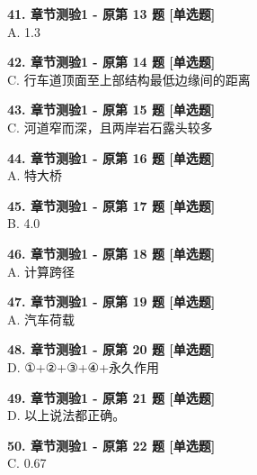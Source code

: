 \documentclass[UTF8,zihao=-4,openany]{ctexbook}
\begin{document}
\begin{answerline}
\textbf{41. 章节测验1 - 原第 13 题 [单选题]}\\
A. 1.3
\end{answerline}

\begin{answerline}
\textbf{42. 章节测验1 - 原第 14 题 [单选题]}\\
C. 行车道顶面至上部结构最低边缘间的距离
\end{answerline}

\begin{answerline}
\textbf{43. 章节测验1 - 原第 15 题 [单选题]}\\
C. 河道窄而深，且两岸岩石露头较多
\end{answerline}

\begin{answerline}
\textbf{44. 章节测验1 - 原第 16 题 [单选题]}\\
A. 特大桥
\end{answerline}

\begin{answerline}
\textbf{45. 章节测验1 - 原第 17 题 [单选题]}\\
B. 4.0
\end{answerline}

\begin{answerline}
\textbf{46. 章节测验1 - 原第 18 题 [单选题]}\\
A. 计算跨径
\end{answerline}

\begin{answerline}
\textbf{47. 章节测验1 - 原第 19 题 [单选题]}\\
A. 汽车荷载
\end{answerline}

\begin{answerline}
\textbf{48. 章节测验1 - 原第 20 题 [单选题]}\\
D. ①+②+③+④+永久作用
\end{answerline}

\begin{answerline}
\textbf{49. 章节测验1 - 原第 21 题 [单选题]}\\
D. 以上说法都正确。
\end{answerline}

\begin{answerline}
\textbf{50. 章节测验1 - 原第 22 题 [单选题]}\\
C. 0.67
\end{answerline}
\end{document}

